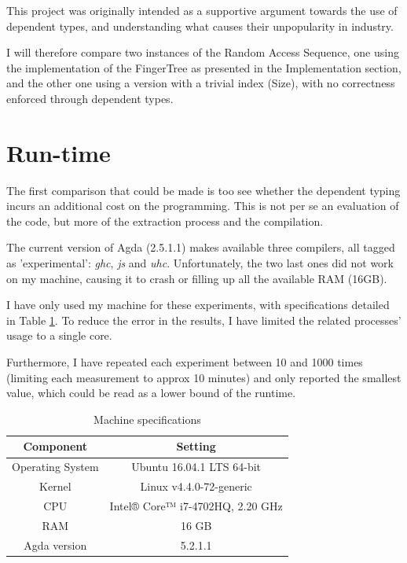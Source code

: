 \documentclass[12pt,twoside,notitlepage]{report}
\begin{document}
This project was originally intended as a supportive argument towards the use of dependent types, and understanding what causes their unpopularity in industry.

I will therefore compare two instances of the Random Access Sequence, one using the implementation of the FingerTree as presented in the Implementation section, and the other one using a version with a trivial index (Size), with no correctness enforced through dependent types.

\section{Run-time}

The first comparison that could be made is too see whether the dependent typing incurs an additional cost on the programming. This is not per se an evaluation of the code, but more of the extraction process and the compilation. 

The current version of Agda (2.5.1.1) makes available three compilers, all tagged as 'experimental': \textit{ghc}, \textit{js} and \textit{uhc}. Unfortunately, the two last ones did not work on my machine, causing it to crash or filling up all the available RAM (16GB).

I have only used my machine for these experiments, with specifications detailed in Table \ref{tab:machine}. To reduce the error in the results, I have limited the related processes' usage to a single core.

Furthermore, I have repeated each experiment between 10 and 1000 times (limiting each measurement to approx 10 minutes) and only reported the smallest value, which could be read as a lower bound of the runtime.

\begin{table}[h!]
\centering
	\begin{tabular}{c c} 
	\hline 
	Component & Setting \\
	\hline
 	Operating System & Ubuntu 16.04.1 LTS 64-bit \\
 	Kernel & Linux v4.4.0-72-generic \\ 
 	CPU & Intel® Core™ i7-4702HQ, 2.20 GHz \\
 	RAM & 16 GB \\
 	Agda version & 5.2.1.1 \\
	\hline
	\end{tabular}
\caption{Machine specifications}
\label{tab:machine}
\end{table} 
\end{document}
